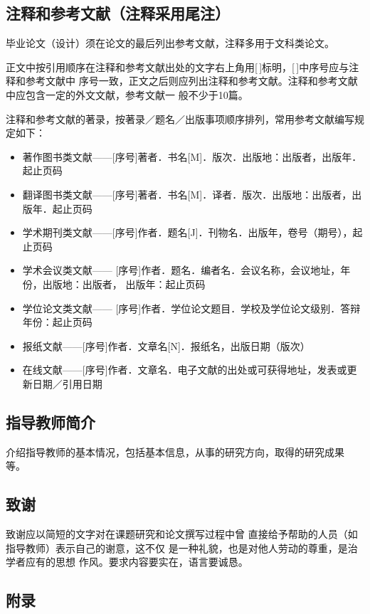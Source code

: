 \subsection{注释和参考文献（注释采用尾注）}
\label{sec:endnote}

毕业论文（设计）须在论文的最后列出参考文献，注释多用于文科类论文。

正文中按引用顺序在注释和参考文献出处的文字右上角用[\,]标明，[\,]中序号应与注释和参考文献中
序号一致，正文之后则应列出注释和参考文献。注释和参考文献中应包含一定的外文文献，参考文献一
般不少于10篇。

注释和参考文献的著录，按著录／题名／出版事项顺序排列，常用参考文献编写规定如下：
\begin{itemize}
\item 著作图书类文献——[序号]著者．书名[M]．版次．出版地：出版者，出版年．起止页码
\item 翻译图书类文献——[序号]著者．书名[M]．译者．版次．出版地：出版者，出版年．起止页码
\item 学术期刊类文献——[序号]作者．题名[J]．刊物名．出版年，卷号（期号），起止页码
\item 学术会议类文献—— [序号]作者．题名．编者名．会议名称，会议地址，年份，出版地：出版者，
  出版年：起止页码
\item 学位论文类文献—— [序号]作者．学位论文题目．学校及学位论文级别．答辩年份：起止页码
\item 报纸文献——[序号]作者．文章名[N]．报纸名，出版日期（版次）
\item 在线文献——[序号]作者．文章名．电子文献的出处或可获得地址，发表或更新日期／引用日期
\end{itemize}

\subsection{指导教师简介}

介绍指导教师的基本情况，包括基本信息，从事的研究方向，取得的研究成果
等。

\subsection{致谢}

致谢应以简短的文字对在课题研究和论文撰写过程中曾
直接给予帮助的人员（如指导教师）表示自己的谢意，这不仅
是一种礼貌，也是对他人劳动的尊重，是治学者应有的思想
作风。要求内容要实在，语言要诚恳。

\subsection{附录}

